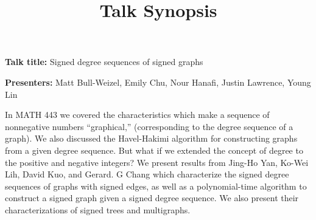 \documentclass[12pt]{article}
\title{Talk Synopsis}
\begin{document}
\maketitle

\textbf{Talk title:} Signed degree sequences of signed graphs

\textbf{Presenters:} Matt Bull-Weizel, Emily Chu, Nour Hanafi, Justin Lawrence,
Young Lin

In MATH 443 we covered the characteristics which make a sequence of nonnegative
numbers ``graphical,'' (corresponding to the degree sequence of a graph). We
also discussed the Havel-Hakimi algorithm for constructing graphs from a given
degree sequence. But what if we extended the concept of degree to the positive
and negative integers? We present results from Jing-Ho Yan, Ko-Wei Lih, David
Kuo, and Gerard. G Chang which characterize the signed degree sequences of
graphs with signed edges, as well as a polynomial-time algorithm to construct a
signed graph given a signed degree sequence. We also present their
characterizations of signed trees and multigraphs.
\end{document}
